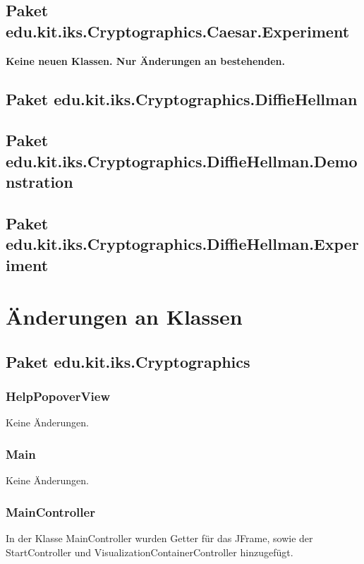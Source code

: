 \documentclass{article}
\begin{document}
  \subsection{Paket edu.kit.iks.Cryptographics.Caesar.Experiment}
   \textbf{Keine neuen Klassen. Nur Änderungen an bestehenden.}
  \subsection{Paket edu.kit.iks.Cryptographics.DiffieHellman}
  
  \subsection{Paket edu.kit.iks.Cryptographics.DiffieHellman.Demonstration}

  \subsection{Paket edu.kit.iks.Cryptographics.DiffieHellman.Experiment}

\section{Änderungen an Klassen}

  \subsection{Paket edu.kit.iks.Cryptographics}
    \subsubsection{HelpPopoverView}
      Keine Änderungen.

    \subsubsection{Main}
      Keine Änderungen.

    \subsubsection{MainController}
      In der Klasse MainController wurden Getter für das JFrame, sowie der StartController
      und VisualizationContainerController hinzugefügt.\newline
\end{document}
